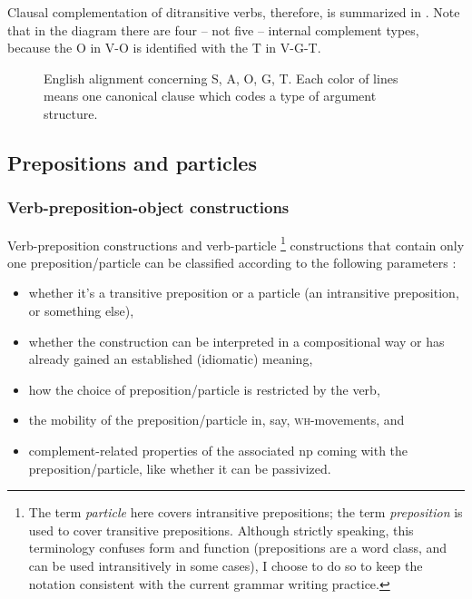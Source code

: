 \documentclass[UTF8, a4paper, oneside, scheme=plain, 12pt]{ctexbook}
\newcommand*{\citepages}[1]{pp.~{#1}}
\newcommand*{\term}[1]{\emph{#1}}
\newcommand{\formcat}[1]{\textsc{#1}}
\begin{document}
Clausal complementation of ditransitive verbs, therefore, is summarized in .
Note that in the diagram there are four -- not five -- internal complement types,
because the O in V-O is identified with the T in V-G-T.

\begin{figure}[H]
    \centering
    
    \caption{English alignment concerning S, A, O, G, T. Each color of lines means one canonical clause which codes a type of argument structure.}
    \label{fig:ditransitive-gt}
\end{figure}

\subsection{Prepositions and particles}

\subsubsection{Verb-preposition-object constructions}\label{sec:vp.valence.verb-prep-obj}

Verb-preposition constructions and verb-particle%
\footnote{
    The term \term{particle} here covers intransitive prepositions;
    the term \term{preposition} is used to cover transitive prepositions.
    Although strictly speaking, 
    this terminology confuses form and function 
    (prepositions are a word class, 
    and can be used intransitively in some cases),
    I choose to do so to keep the notation consistent with 
    the current grammar writing practice.
}
constructions
that contain only one preposition/particle
can be classified according to the following parameters
\citep[\citepages{272-274}]{cgel}:
\begin{itemize}
    \item whether it's a transitive preposition or a particle 
    (an intransitive preposition, or something else),
    \item whether the construction can be interpreted in a compositional way or 
    has already gained an established (idiomatic) meaning,
    \item how the choice of preposition/particle is restricted by the verb,  
    \item the mobility of the preposition/particle 
    in, say, \formcat{wh}-movements, and 
    \item complement-related properties of the associated \acs{np} coming with the preposition/particle,
    like whether it can be passivized.
\end{itemize}
\end{document}
